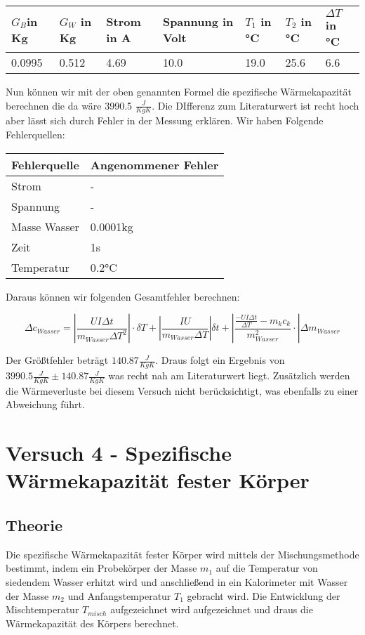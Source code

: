         \begin{table}[H]
            \centering
            \begin{tabular}{|l|l|l|l|l|l|l|}
                \hline
                $G_{B}$in Kg & $G_{W}$ in Kg & Strom in A & Spannung in Volt  & $T_{1}$ in °C & $T_{2}$ in °C & $\Delta T$ in °C \\
                \hline
                 0.0995& 0.512 & 4.69 & 10.0 & 19.0 & 25.6 & 6.6 \\
                \hline
    
            \end{tabular}
        \end{table}
        Nun können wir mit der oben genannten Formel die spezifische Wärmekapazität berechnen die da wäre 3990.5 $\frac{J}{KgK}$. Die DIfferenz zum Literaturwert ist recht hoch aber lässt sich durch Fehler in der Messung erklären. 
Wir haben Folgende Fehlerquellen:
\begin{table}[H]
	\centering
	\begin{tabular}{|l|l|}
		\hline
		Fehlerquelle & Angenommener Fehler\\
		\hline
		Strom& - \\
		\hline
		Spannung& -\\
		\hline
		Masse Wasser& 0.0001kg \\
		\hline
		Zeit & 1s\\
		\hline
		Temperatur & 0.2°C\\
	 \hline
	\end{tabular}
\end{table}
Daraus können wir folgenden Gesamtfehler berechnen:

$$\Delta c_{Wasser}  = \left| \frac{U I \Delta t}{m_{Wasser} \Delta T^2} \right| \cdot \delta T + \left| \frac{I U}{m_{Wasser} \Delta T} \right| \delta t +  \left| \frac{\frac{-U I \Delta t}{\Delta T} - m_{k}c_{k}}{m^2_{Wasser}} \cdot \right| \Delta m_{Wasser}  $$

Der Größtfehler beträgt $140.87 \frac{J}{KgK}$. Draus folgt ein Ergebnis von $ 3990.5 \frac{J}{KgK} \pm 140.87 \frac{J}{KgK}$ was recht nah am Literaturwert liegt.  Zusätzlich werden die Wärmeverluste bei diesem Versuch nicht berücksichtigt, was ebenfalls zu einer Abweichung führt. 
\section{Versuch 4 - Spezifische Wärmekapazität fester Körper}
	    \subsection{Theorie}
	Die spezifische Wärmekapazität fester Körper wird mittels der Mischungsmethode bestimmt, indem ein Probekörper der Masse $m_{1}$ auf die Temperatur von siedendem Wasser erhitzt wird und anschließend in ein Kalorimeter mit Wasser der Masse $m_{2}$ und Anfangstemperatur $T_{1}$ gebracht wird. Die Entwicklung der Mischtemperatur $T_{misch}$ aufgezeichnet wird aufgezeichnet und draus die Wärmekapazität des Körpers berechnet.
	
